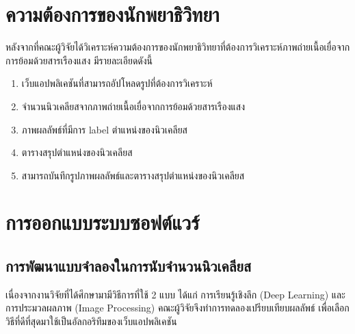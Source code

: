 \documentclass[12pt,oneside,openright,a4paper]{cpe-thai-project}
\begin{document}
\section{ความต้องการของนักพยาธิวิทยา}
หลังจากที่คณะผู้วิจัยได้วิเคราะห์ความต้องการของนักพยาธิวิทยาที่ต้องการวิเคราะห์ภาพถ่ายเนื้อเยื่อจากการย้อมด้วยสารเรืองแสง มีรายละเอียดดังนี้
\begin{enumerate}
    \item เว็บแอปพลิเคชันที่สามารถอัปโหลดรูปที่ต้องการวิเคราะห์
	\item จำนวนนิวเคลียสจากภาพถ่ายเนื้อเยื่อจากการย้อมด้วยสารเรืองแสง
	\item ภาพผลลัพธ์ที่มีการ label ตำแหน่งของนิวเคลียส
    \item ตารางสรุปตำแหน่งของนิวเคลียส
    \item สามารถบันทึกรูปภาพผลลัพธ์และตารางสรุปตำแหน่งของนิวเคลียส
\end{enumerate}
\section{การออกแบบระบบซอฟต์แวร์}
\subsection{การพัฒนาแบบจำลองในการนับจำนวนนิวเคลียส}
เนื่องจากงานวิจัยที่ได้ศึกษามามีวิธีการที่ใช้ 2 แบบ ได้แก่ การเรียนรู้เชิงลึก (Deep Learning) และ การประมวลผลภาพ (Image Processing) คณะผู้วิจัยจึงทำการทดลองเปรียบเทียบผลลัพธ์ เพื่อเลือกวิธีที่ดีที่สุดมาใช้เป็นอัลกอริทึมของเว็บแอปพลิเคชัน
\end{document}
